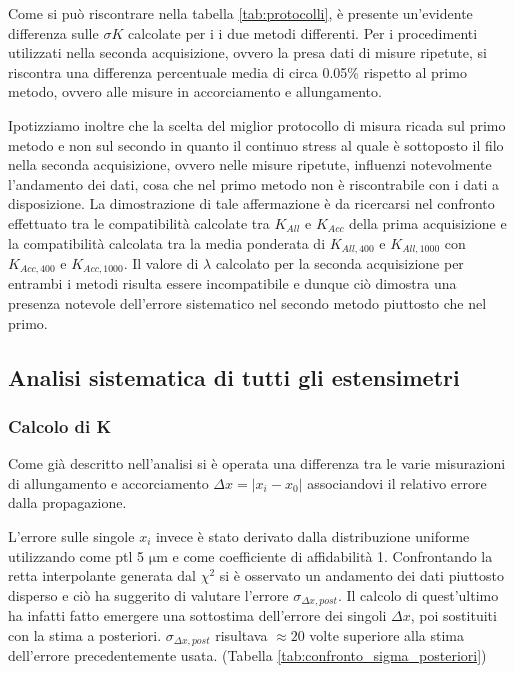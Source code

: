 \documentclass[a4paper,11pt,oneside]{article}
\begin{document}
Come si può riscontrare nella tabella \ref{tab:protocolli}, è presente un'evidente differenza sulle $\sigma K$ calcolate per i i due metodi differenti. Per i procedimenti utilizzati nella seconda acquisizione, ovvero la presa dati di misure ripetute, si riscontra una differenza percentuale media di circa 0.05\%  rispetto al primo metodo, ovvero alle misure in accorciamento e allungamento. 

Ipotizziamo inoltre che la scelta del miglior protocollo di misura ricada sul primo metodo e non sul secondo in quanto il continuo stress al quale è sottoposto il filo nella seconda acquisizione, ovvero nelle misure ripetute, influenzi notevolmente l'andamento dei dati, cosa che nel primo metodo non è riscontrabile con i dati a disposizione. La dimostrazione di tale affermazione è da ricercarsi nel confronto effettuato tra le compatibilità calcolate tra  $K_{All}$ e $K_{Acc}$ della prima acquisizione e la compatibilità calcolata tra la media ponderata di $K_{All, 400}$ e $K_{All, 1000}$ con $K_{Acc, 400}$ e $K_{Acc, 1000}$. Il valore di $\lambda$ calcolato per la seconda acquisizione per entrambi i metodi risulta essere incompatibile e dunque ciò dimostra una presenza notevole dell'errore sistematico nel secondo metodo piuttosto che nel primo.

\subsection{Analisi sistematica di tutti gli estensimetri}
\subsubsection*{Calcolo di K}
Come già descritto nell'analisi si è operata una differenza tra le varie misurazioni di allungamento e accorciamento $\Delta x= |x_i - x_0|$ associandovi il relativo errore dalla propagazione.

L'errore sulle singole $x_i$ invece è stato derivato dalla distribuzione uniforme utilizzando come ptl 5 $\si{\micro\meter}$ e come coefficiente di affidabilità 1. Confrontando la retta interpolante generata dal $\chi^2$ si è osservato un andamento dei dati piuttosto disperso e ciò ha suggerito di valutare l'errore $\sigma_{\Delta x, post}$. Il calcolo di quest'ultimo ha infatti fatto emergere una sottostima dell'errore dei singoli $\Delta x$, poi sostituiti con la stima a posteriori. $\sigma_{\Delta x, post}$ risultava $\approx 20$ volte superiore alla stima dell'errore precedentemente usata. (Tabella \ref{tab:confronto_sigma_posteriori})
\end{document}
